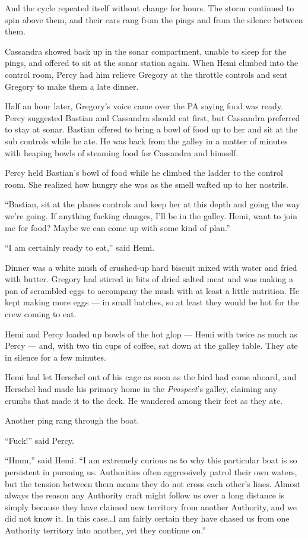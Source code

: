 \documentclass[
]{scrbook}
\begin{document}
And the cycle repeated itself without change for hours. The storm
continued to spin above them, and their ears rang from the pings and
from the silence between them.

Cassandra showed back up in the sonar compartment, unable to sleep for
the pings, and offered to sit at the sonar station again. When Hemi
climbed into the control room, Percy had him relieve Gregory at the
throttle controls and sent Gregory to make them a late dinner.

\bigskip

Half an hour later, Gregory's voice came over the PA saying food was
ready. Percy suggested Bastian and Cassandra should eat first, but
Cassandra preferred to stay at sonar. Bastian offered to bring a bowl of
food up to her and sit at the sub controls while he ate. He was back
from the galley in a matter of minutes with heaping bowls of steaming
food for Cassandra and himself.

Percy held Bastian's bowl of food while he climbed the ladder to the
control room. She realized how hungry she was as the smell wafted up to
her nostrils.

``Bastian, sit at the planes controls and keep her at this depth and
going the way we're going. If anything fucking changes, I'll be in the
galley. Hemi, want to join me for food? Maybe we can come up with some
kind of plan.''

``I am certainly ready to eat,'' said Hemi.

Dinner was a white mush of crushed-up hard biscuit mixed with water and
fried with butter. Gregory had stirred in bits of dried salted meat and
was making a pan of scrambled eggs to accompany the mush with at least a
little nutrition. He kept making more eggs --- in small batches, so at
least they would be hot for the crew coming to eat.

Hemi and Percy loaded up bowls of the hot glop --- Hemi with twice as
much as Percy --- and, with two tin cups of coffee, sat down at the
galley table. They ate in silence for a few minutes.

Hemi had let Herschel out of his cage as soon as the bird had come
aboard, and Herschel had made his primary home in the \emph{Prospect}'s
galley, claiming any crumbs that made it to the deck. He wandered among
their feet as they ate.

Another ping rang through the boat.

``Fuck!'' said Percy.

``Hmm,'' said Hemi. ``I am extremely curious as to why this particular
boat is so persistent in pursuing us. Authorities often aggressively
patrol their own waters, but the tension between them means they do not
cross each other's lines. Almost always the reason any Authority craft
might follow us over a long distance is simply because they have claimed
new territory from another Authority, and we did not know it. In this
case\ldots I am fairly certain they have chased us from one Authority
territory into another, yet they continue on.''
\end{document}
